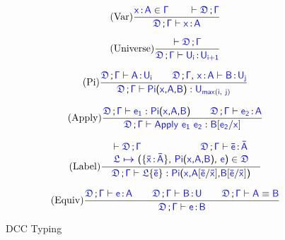 \begin{figure}
\renewcommand{\arraystretch}{1.3}
	\begin{equation}
		\tag{Var}
		\frac
			{\itemtype{x}{A} \in \target{\Gamma} \qquad
			 \vdash \target{\fdef}\semicolon \target{\Gamma} }
			{\target{\fdef}\semicolon \target{\Gamma} \vdash \itemtype{x}{A}}
	\end{equation}

	\begin{equation}
		\tag{Universe}
		\frac
			{\vdash \target{\fdef}\semicolon \target{\Gamma} }
			{\target{\fdef}\semicolon \target{\Gamma} \vdash \itemtype{U_i}{U_{i+1}}}
	\end{equation}

	\begin{equation}
		\tag{Pi}
		\frac
			{\target{\fdef}\semicolon \target{\Gamma} \vdash \itemtype{A}{U_i} \qquad
			 \target{\fdef}\semicolon \target{\Gamma}\sfcomma \itemtype{x}{A} \vdash \itemtype{B}{U_j}
			}
			{\target{\fdef}\semicolon \target{\Gamma} \vdash \targetpi{x}{A}{B} \mathrel{:} \target{U}_{\target{max}(\target{i},\ \target{j})} }
	\end{equation}

	\begin{equation}
		\tag{Apply}
		\frac
			{\target{\fdef}\semicolon \target{\Gamma} \vdash \target{e_1} \mathrel{:} \targetpi{x}{A}{B} \qquad
			 \target{\fdef}\semicolon \target{\Gamma} \vdash \itemtype{e_2}{A} }
			{\target{\fdef}\semicolon \target{\Gamma} \vdash \targetapp{e_1}{e_2} \mathrel{:} \target{B} \targetsub{e_2}{x}}
	\end{equation}

	\begin{equation}
		\tag{Label}
		\frac
			{\begin{array}{l}
			  	\vdash \target{\fdef}\semicolon \target{\Gamma} \qquad\qquad\qquad \target{\fdef}\semicolon \target{\Gamma} \vdash \itemtype{\bar{e}}{\bar{A}} \\
			  	\itemdef{\target{\flabel}}{\itemtype{\bar{x}}{\bar{A}}}{\targetpi{x}{A}{B}}{\target{e}} \in \target{\fdef} \\
			 \end{array}	 
			}
			{\quad \target{\fdef}\semicolon \target{\Gamma} \vdash \targetlab{\flabel}{\bar{e}} \mathrel{:} 
			 \target{Pi}\textsf{(}\target{x}\textsf{,} \target{A} \targetsub{\bar{e}}{\bar{x}}\textsf{,} \target{B} \targetsub{\bar{e}}{\bar{x}}\textsf{)} \quad
			}
	\end{equation}

	\begin{equation}
		\tag{Equiv}
		\frac
			{\target{\fdef}\semicolon \target{\Gamma} \vdash \itemtype{e}{A} \qquad
			 \target{\fdef}\semicolon \target{\Gamma} \vdash \itemtype{B}{U} \qquad
			 \target{\fdef}\semicolon \target{\Gamma} \vdash \target{A} \equiv \target{B}
			}
			{\target{\fdef}\semicolon \target{\Gamma} \vdash \itemtype{e}{B}}
	\end{equation}
	\caption{DCC Typing}
    \label{fig:dcc typing}
\end{figure}

